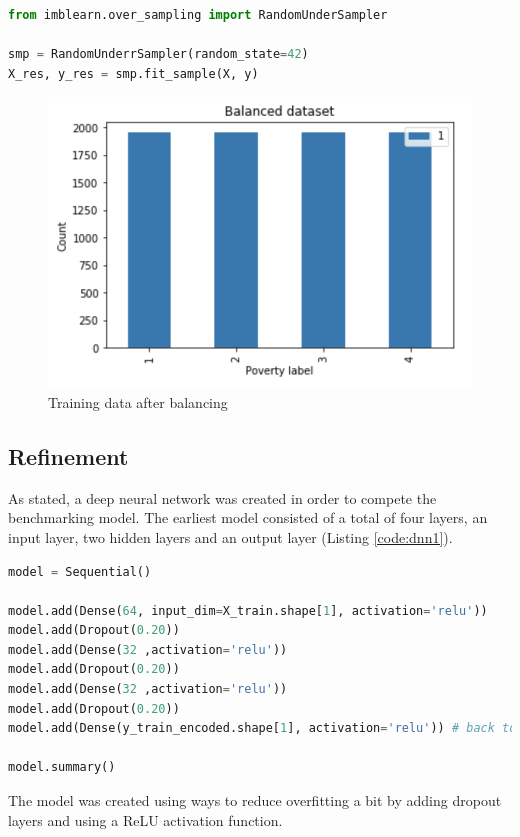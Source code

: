\documentclass[preprint,12pt]{elsarticle}
\begin{document}
\begin{lstlisting}[language=Python,label={code:balancing},caption={Balance dataset in python}]
from imblearn.over_sampling import RandomUnderSampler

smp = RandomUnderrSampler(random_state=42)
X_res, y_res = smp.fit_sample(X, y)
\end{lstlisting}

\begin{figure}[!h]
\centering\includegraphics[width=0.8\linewidth]{balanced_dataset}
\caption{Training data after balancing}
\label{fig:balanced_dataset}
\end{figure}

\subsection{Refinement}
As stated, a deep neural network was created in order to compete the benchmarking model. The earliest model consisted of a total of four layers, an input layer, two hidden layers and an output layer (Listing \ref{code:dnn1}).

\begin{lstlisting}[language=Python, label={code:dnn1},caption={Earliest Deep Neural Network}]
model = Sequential()

model.add(Dense(64, input_dim=X_train.shape[1], activation='relu'))
model.add(Dropout(0.20))
model.add(Dense(32 ,activation='relu'))
model.add(Dropout(0.20))
model.add(Dense(32 ,activation='relu'))
model.add(Dropout(0.20))
model.add(Dense(y_train_encoded.shape[1], activation='relu')) # back to one-hot-encoded result

model.summary()
\end{lstlisting}

The model was created using ways to reduce overfitting a bit by adding dropout layers\cite{Srivastava:2014} and using a ReLU activation function. 
\end{document}
